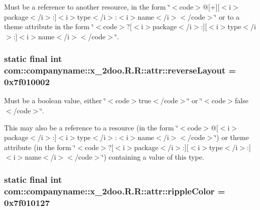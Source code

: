 Must be a reference to another resource, in the form \char`\"{}$<$code$>$@\mbox{[}+\mbox{]}\mbox{[}$<$i$>$package$<$/i$>$:\mbox{]}$<$i$>$type$<$/i$>$:$<$i$>$name$<$/i$>$$<$/code$>$\char`\"{} or to a theme attribute in the form \char`\"{}$<$code$>$?\mbox{[}$<$i$>$package$<$/i$>$:\mbox{]}\mbox{[}$<$i$>$type$<$/i$>$:\mbox{]}$<$i$>$name$<$/i$>$$<$/code$>$\char`\"{}. \hypertarget{classcom_1_1companyname_1_1x__2doo_1_1_r_1_1attr_0f2a4d7f16391293fe0ad6e314feae45}{
\subsubsection[{reverseLayout}]{\setlength{\rightskip}{0pt plus 5cm}static final int com::companyname::x\_\-2doo.R.R::attr::reverseLayout = 0x7f010002}}
\label{classcom_1_1companyname_1_1x__2doo_1_1_r_1_1attr_0f2a4d7f16391293fe0ad6e314feae45}


Must be a boolean value, either \char`\"{}$<$code$>$true$<$/code$>$\char`\"{} or \char`\"{}$<$code$>$false$<$/code$>$\char`\"{}. 

This may also be a reference to a resource (in the form \char`\"{}$<$code$>$@\mbox{[}$<$i$>$package$<$/i$>$:\mbox{]}$<$i$>$type$<$/i$>$:$<$i$>$name$<$/i$>$$<$/code$>$\char`\"{}) or theme attribute (in the form \char`\"{}$<$code$>$?\mbox{[}$<$i$>$package$<$/i$>$:\mbox{]}\mbox{[}$<$i$>$type$<$/i$>$:\mbox{]}$<$i$>$name$<$/i$>$$<$/code$>$\char`\"{}) containing a value of this type. \hypertarget{classcom_1_1companyname_1_1x__2doo_1_1_r_1_1attr_63d6e91e446c8128178a420a03732e41}{
\subsubsection[{rippleColor}]{\setlength{\rightskip}{0pt plus 5cm}static final int com::companyname::x\_\-2doo.R.R::attr::rippleColor = 0x7f010127}}
\label{classcom_1_1companyname_1_1x__2doo_1_1_r_1_1attr_63d6e91e446c8128178a420a03732e41}


